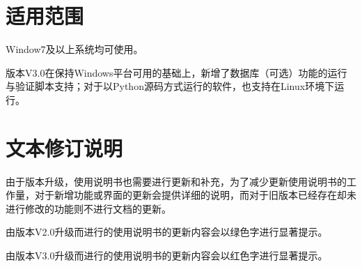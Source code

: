 \section{适用范围}
Window7及以上系统均可使用。

	{\color{myred}
	版本V3.0在保持Windows平台可用的基础上，新增了数据库（可选）功能的运行与验证脚本支持；对于以Python源码方式运行的软件，也支持在Linux环境下运行。
}

\section{文本修订说明}

{
	\Large
	由于版本升级，使用说明书也需要进行更新和补充，为了减少更新使用说明书的工作量，对于新增功能或界面的更新会提供详细的说明，而对于旧版本已经存在却未进行修改的功能则不进行文档的更新。
	
	\color{mygreen}由版本V2.0升级而进行的使用说明书的更新内容会以绿色字进行显著提示。
	
	\color{myred}由版本V3.0升级而进行的使用说明书的更新内容会以红色字进行显著提示。
}
\newpage